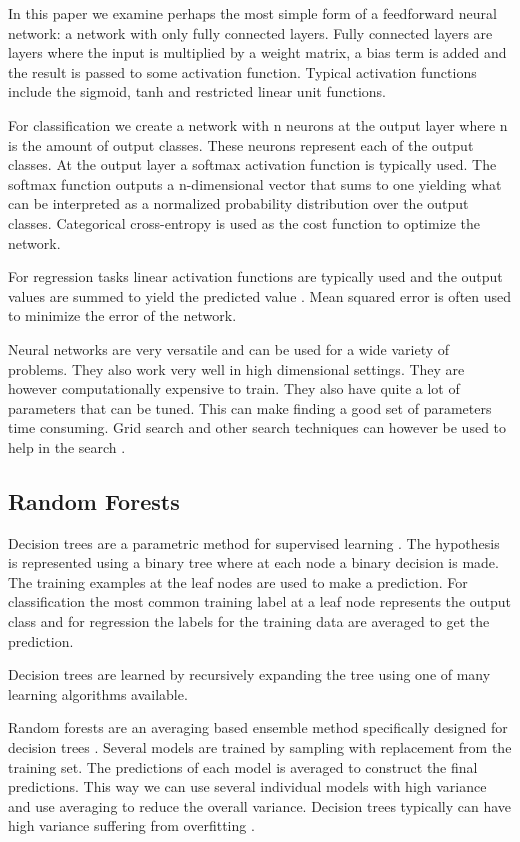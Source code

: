 In this paper we examine perhaps the most simple form of a feedforward neural network: a network with only fully connected layers. Fully connected layers are layers where the input is multiplied by a weight matrix, a bias term is added and the result is passed to some activation function. Typical activation functions include the sigmoid, tanh and restricted linear unit functions.

For classification we create a network with n neurons at the output layer where n is the amount of output classes. These neurons represent each of the output classes. At the output layer a softmax activation function is typically used. The softmax function outputs a n-dimensional vector that sums to one yielding what can be interpreted as a normalized probability distribution over the output classes. Categorical cross-entropy is used as the cost function to optimize the network. \cite{theano}

For regression tasks linear activation functions are typically used and the output values are summed to yield the predicted value \cite{deeplearning4j-docs}. Mean squared error is often used to minimize the error of the network.

Neural networks are very versatile and can be used for a wide variety of problems. They also work very well in high dimensional settings. They are however computationally expensive to train. They also have quite a lot of parameters that can be tuned. This can make finding a good set of parameters time consuming. Grid search and other search techniques can however be used to help in the search \cite{deep-learning-book}.

\subsection{Random Forests}

Decision trees are a parametric method for supervised learning \cite{alpaydin}. The hypothesis is represented using a binary tree where at each node a binary decision is made. The training examples at the leaf nodes are used to make a prediction. For classification the most common training label at a leaf node represents the output class and for regression the labels for the training data are averaged to get the prediction.

Decision trees are learned by recursively expanding the tree using one of many learning algorithms available.

Random forests are an averaging based ensemble method specifically designed for decision trees \cite{sklearn}. Several models are trained by sampling with replacement from the training set. The predictions of each model is averaged to construct the final predictions. This way we can use several individual models with high variance and use averaging to reduce the overall variance. Decision trees typically can have high variance suffering from overfitting \cite{alpaydin}.

